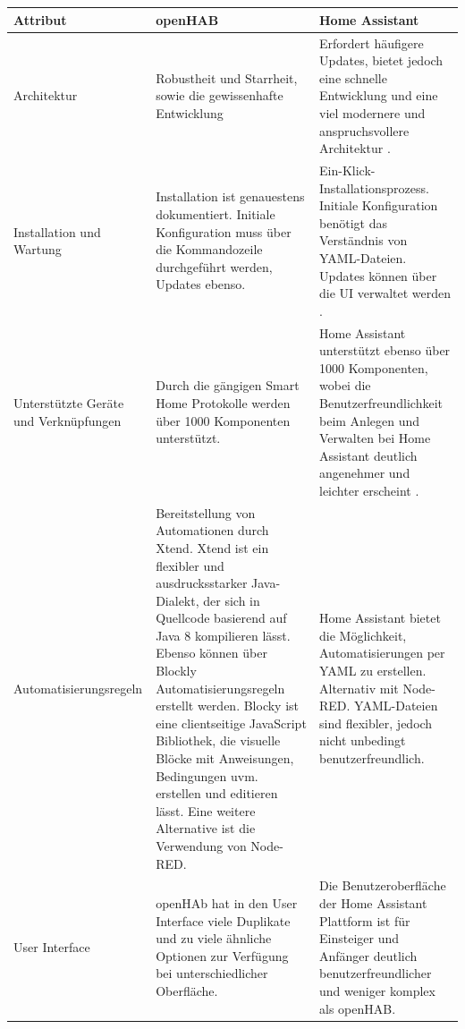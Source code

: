 \documentclass[
  ngerman           %
  ,twoside          %
  ,11pt
  ,pdftex
]{report}
\begin{document}
\chapter{}
\label{appendix:comparison}
\begin{table}[hbt!]
  \begin{center}
      \begin{tabular}{| p{3.0cm} | p{6.2cm} | p{6.2cm} | }
          \hline
            \textbf{Attribut} & \textbf{openHAB} & \textbf{Home Assistant} \\
          \hline
            Architektur & Robustheit und Starrheit, sowie die gewissenhafte Entwicklung & Erfordert häufigere Updates, bietet jedoch eine schnelle Entwicklung und eine viel modernere und anspruchsvollere Architektur \cite{sh-uni-comparison}. \\ 
          \hline
            Installation und Wartung & Installation ist genauestens dokumentiert. Initiale Konfiguration muss über die Kommandozeile durchgeführt werden, Updates ebenso. & Ein-Klick-Installationsprozess. Initiale Konfiguration benötigt das Verständnis von YAML-Dateien. Updates können über die UI verwaltet werden \cite{sh-uni-comparison}. \\ 
          \hline
            Unterstützte Geräte und Verknüpfungen & Durch die gängigen Smart Home Protokolle werden über 1000 Komponenten unterstützt. & Home Assistant unterstützt ebenso über 1000 Komponenten, wobei die Benutzerfreundlichkeit beim Anlegen und Verwalten bei Home Assistant deutlich angenehmer und leichter erscheint \cite{msuttner-comparison}. \\ 
          \hline
            Automatisierungsregeln & Bereitstellung von Automationen durch Xtend. Xtend ist ein flexibler und ausdrucksstarker Java-Dialekt, der sich in Quellcode basierend auf Java 8 kompilieren lässt. Ebenso können über Blockly Automatisierungsregeln erstellt werden. Blocky ist eine clientseitige JavaScript Bibliothek, die visuelle Blöcke mit Anweisungen, Bedingungen uvm. erstellen und editieren lässt. Eine weitere Alternative ist die Verwendung von Node-RED.  & Home Assistant bietet die Möglichkeit, Automatisierungen per YAML zu erstellen. Alternativ mit Node-RED. YAML-Dateien sind flexibler, jedoch nicht unbedingt benutzerfreundlich. \\ 
          \hline
            User Interface & openHAb hat in den User Interface viele Duplikate und zu viele ähnliche Optionen zur Verfügung bei unterschiedlicher Oberfläche. & Die Benutzeroberfläche der Home Assistant Plattform ist für Einsteiger und Anfänger deutlich benutzerfreundlicher und weniger komplex als openHAB. \\

\end{tabular}
\end{center}
\end{table}
\end{document}
